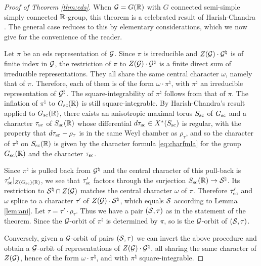 \documentclass{article}
\theoremstyle{definition}
\numberwithin{equation}{section}
\renewcommand{\-}{\hyp{}}
\begin{document}
\begin{proof}[Proof of Theorem \ref{thm:eds}]
	When $\mathcal{G}=G(\mathbb{R})$ with $G$ connected semi-simple simply connected $\mathbb{R}$-group, this theorem is a celebrated result of Harish-Chandra \cite{HCDSI}. The general case reduces to this by elementary considerations, which we now give for the convenience of the reader.

Let $\pi$ be an eds representation of $\mathcal{G}$. Since $\pi$ is irreducible and $Z(\mathcal{G})\cdot \mathcal{G}^\natural$ is of finite index in $\mathcal{G}$, the restriction of $\pi$ to $Z(\mathcal{G})\cdot \mathcal{G}^\natural$ is a finite direct sum of irreducible representations. They all share the same central character $\omega$, namely that of $\pi$. Therefore, each of them is of the form $\omega \cdot \pi^\natural$, with $\pi^\natural$ an irreducible representation of $\mathcal{G}^\natural$. The square-integrability of $\pi^\natural$ follows from that of $\pi$. The inflation of $\pi^\natural$ to $G_{\textrm{sc}}(\mathbb{R})$ is still square-integrable. By Harish-Chandra's result applied to $G_{\textrm{sc}}(\mathbb{R})$, there exists an anisotropic maximal torus $S_{\textrm{sc}}$ of $G_{\textrm{sc}}$ and a character $\tau_{\textrm{sc}}$ of $S_{\textrm{sc}}(\mathbb{R})$ whose differential $d\tau_{\textrm{sc}}\in X^*(S_{\textrm{sc}})$ is regular, with the property that
$d\tau_{\textrm{sc}}-\rho_\tau$ is in the same Weyl chamber as $\rho_\tau$, and so
the character of $\pi^\natural$ on $S_{\textrm{sc}}(\mathbb{R})$ is given by the character formula \eqref{eq:charfmla} for the group
 $G_{\textrm{sc}}(\mathbb{R})$ and the character $\tau_{\textrm{sc}}$.

Since $\pi^\natural$ is pulled back from $\mathcal{G}^\natural$ and the central character of this pull-back is $\tau'_{\textrm{sc}}|_{Z(G_{\textrm{sc}})(\mathbb{R})}$, we see that $\tau'_{\textrm{sc}}$ factors through the surjection $S_{\textrm{sc}}(\mathbb{R}) \to \mathcal{S}^\natural$. Its restriction to $\mathcal{S}^\natural \cap Z(\mathcal{G})$ matches the central character $\omega$ of $\pi$. Therefore $\tau'_{\textrm{sc}}$ and $\omega$ splice to a character $\tau'$ of $Z(\mathcal{G}) \cdot \mathcal{S}^\natural$, which equals  $\mathcal{S}$ according to Lemma \ref{lem:ani}. Let $\tau=\tau' \cdot \rho_\tau$. Thus we have a pair $(\mathcal{S},\tau)$ as in the statement of the theorem. Since the $\mathcal{G}$-orbit of $\pi^\natural$ is determined by $\pi$, so is the $\mathcal{G}$-orbit of $(\mathcal{S},\tau)$.

	Conversely, given a $\mathcal{G}$-orbit of pairs $(\mathcal{S},\tau)$ we can invert the above procedure and obtain a $\mathcal{G}$-orbit of representations of $Z(\mathcal{G}) \cdot \mathcal{G}^\natural$, all sharing the same character of $Z(\mathcal{G})$, hence of the form $\omega \cdot \pi^\natural$, and with $\pi^\natural$ square-integrable.


\end{proof}
\end{document}
